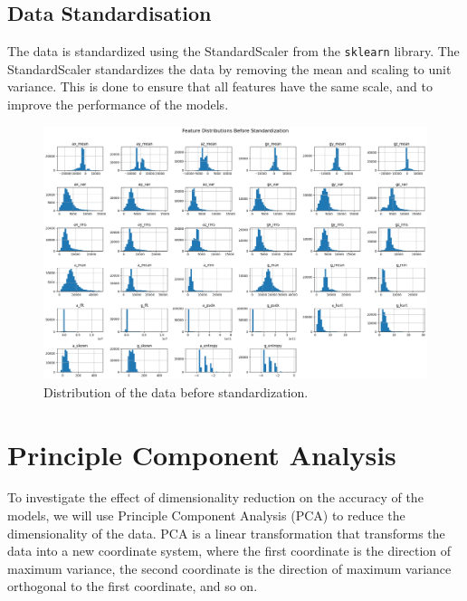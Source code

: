\documentclass[12pt]{article}
\begin{document}
\vspace{20pt}

\subsection{Data Standardisation}
\noindent
The data is standardized using the StandardScaler from the \texttt{sklearn} library. The StandardScaler standardizes the data by removing the mean and scaling to unit variance. This is done to ensure that all features have the same scale, and to improve the performance of the models.

\begin{figure}[H]
\centering
\includegraphics[width=1.0\textwidth]{figures/data_distribution.png}
\caption{Distribution of the data before standardization.}
\label{fig:data_distribution}
\end{figure}


\vspace{20pt}

\section{Principle Component Analysis}
\noindent
To investigate the effect of dimensionality reduction on the accuracy of the models, we will use Principle Component Analysis (PCA) to reduce the dimensionality of the data. PCA is a linear transformation that transforms the data into a new coordinate system, where the first coordinate is the direction of maximum variance, the second coordinate is the direction of maximum variance orthogonal to the first coordinate, and so on. 
\end{document}
